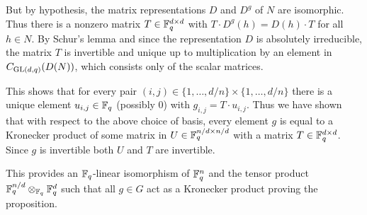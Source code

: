 But by hypothesis, the matrix representations $D$ and $D^g$ of $N$
are isomorphic. Thus there is a nonzero matrix $T \in \mathbb{F}_q^{d \times d}$ with
$T \cdot D^g(h) = D(h) \cdot T$ for all $h \in N$. By Schur's lemma and
since the representation $D$ is absolutely irreducible,
the matrix $T$ is invertible and unique 
up to multiplication by an element in $C_{\GL(d,q)}(D(N))$, which
consists only of the scalar matrices.

This shows that for every pair $(i,j) \in \{ 1, \ldots, d/n \} \times 
\{ 1, \ldots, d/n \}$ there
is a unique element $u_{i,j} \in \mathbb{F}_q$ (possibly $0$) with 
$g_{i,j} = T \cdot u_{i,j}$. Thus we have shown that with respect to
the above choice of basis, every element $g$ is equal to a Kronecker 
product of some matrix in $U \in \mathbb{F}_q^{n/d \times n/d}$ with a matrix
$T \in \mathbb{F}_q^{d \times d}$. Since $g$ is invertible both 
$U$ and $T$ are invertible. 

This provides an $\mathbb{F}_q$-linear isomorphism of 
$\mathbb{F}_q^n$ and the tensor product $\mathbb{F}_q^{n/d} \otimes_{\mathbb{F}_q} \mathbb{F}_q^d$
such that all $g \in G$ act as a Kronecker product proving the
proposition.
\proofend


